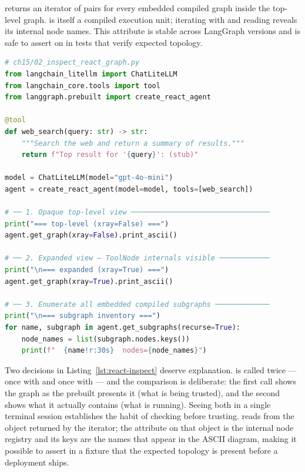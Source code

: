  returns an iterator of
 pairs for every embedded compiled graph inside the
top-level graph.  is itself a compiled 
execution unit; iterating with  and reading
 reveals its internal node names. This
attribute is stable across LangGraph versions and is safe to assert on in
 tests that verify expected topology.

\begin{lstlisting}[language=Python,
  caption={Inspecting compiled topology with \texttt{get\_graph} and \texttt{get\_subgraphs}},
  label={lst:react-inspect}]
# ch15/02_inspect_react_graph.py
from langchain_litellm import ChatLiteLLM
from langchain_core.tools import tool
from langgraph.prebuilt import create_react_agent

@tool
def web_search(query: str) -> str:
    """Search the web and return a summary of results."""
    return f"Top result for '{query}': (stub)"

model = ChatLiteLLM(model="gpt-4o-mini")
agent = create_react_agent(model=model, tools=[web_search])

# ── 1. Opaque top-level view ─────────────────────────────────
print("=== top-level (xray=False) ===")
agent.get_graph(xray=False).print_ascii()

# ── 2. Expanded view — ToolNode internals visible ────────────
print("\n=== expanded (xray=True) ===")
agent.get_graph(xray=True).print_ascii()

# ── 3. Enumerate all embedded compiled subgraphs ─────────────
print("\n=== subgraph inventory ===")
for name, subgraph in agent.get_subgraphs(recurse=True):
    node_names = list(subgraph.nodes.keys())
    print(f"  {name!r:30s}  nodes={node_names}")
\end{lstlisting}

Two decisions in Listing~\ref{lst:react-inspect} deserve explanation.
 is called twice --- once with  and once
with  --- and the comparison is deliberate: the first call
shows the graph as the prebuilt presents it (what is being trusted), and
the second shows what it actually contains (what is running). Seeing both
in a single terminal session establishes the habit of checking before
trusting.  reads from the 
object returned by the iterator; the  attribute on that object
is the internal node registry and its keys are the names that appear in the
 ASCII diagram, making it possible to assert in a
 fixture that the expected topology is present before a
deployment ships.

